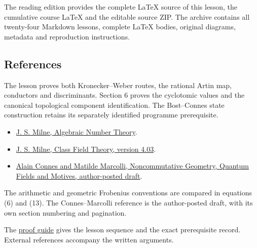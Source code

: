 \documentclass[11pt,a4paper]{article}
\newcommand{\tightlist}{\setlength{\itemsep}{0pt}\setlength{\parskip}{0pt}}
\begin{document}
The reading edition provides the complete LaTeX source of this lesson,
the cumulative course LaTeX and the editable source ZIP. The archive
contains all twenty-four Markdown lessons, complete LaTeX bodies,
original diagrams, metadata and reproduction instructions.

\subsection{References}\label{references}

The lesson proves both Kronecker--Weber routes, the rational Artin map,
conductors and discriminants. Section 6 proves the cyclotomic values and
the canonical topological component identification. The Bost--Connes
state construction retains its separately identified programme
prerequisite.

\begin{itemize}
\tightlist
\item
  \href{https://www.jmilne.org/math/CourseNotes/ANT.pdf}{J. S. Milne,
  Algebraic Number Theory}.
\item
  \href{https://www.jmilne.org/math/CourseNotes/CFT.pdf}{J. S. Milne,
  Class Field Theory, version 4.03}.
\item
  \href{https://alainconnes.org/wp-content/uploads/bookwebfinal-2.pdf}{Alain
  Connes and Matilde Marcolli, Noncommutative Geometry, Quantum Fields
  and Motives, author-posted draft}.
\end{itemize}

The arithmetic and geometric Frobenius conventions are compared in
equations (6) and (13). The Connes--Marcolli reference is the
author-posted draft, with its own section numbering and pagination.

The \href{../free-proofs.html}{proof guide} gives the lesson sequence
and the exact prerequisite record. External references accompany the
written arguments.
\end{document}
